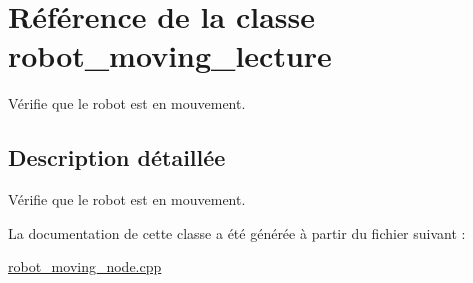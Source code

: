 \hypertarget{classrobot__moving__lecture}{}\section{Référence de la classe robot\+\_\+moving\+\_\+lecture}
\label{classrobot__moving__lecture}


Vérifie que le robot est en mouvement.  




\subsection{Description détaillée}
Vérifie que le robot est en mouvement. 

La documentation de cette classe a été générée à partir du fichier suivant \+:\begin{DoxyCompactItemize}
\item 
\hyperlink{robot__moving__node_8cpp}{robot\+\_\+moving\+\_\+node.\+cpp}\end{DoxyCompactItemize}
